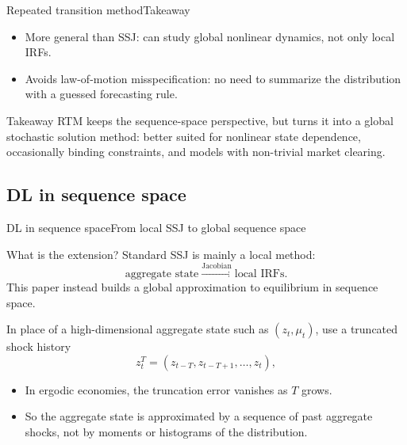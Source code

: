 \documentclass[aspectratio=169]{beamer}
\begin{document}
\begin{frame}{Repeated transition method}{Takeaway \cite{lee2025global}}
\small

\begin{itemize}
    \item \alert{More general than SSJ}: can study global nonlinear dynamics, not only local IRFs.
    \item \alert{Avoids law-of-motion misspecification}: no need to summarize the distribution with a guessed forecasting rule.
\end{itemize}

\begin{alertblock}{Takeaway}
RTM keeps the sequence-space perspective, but turns it into a \alert{global stochastic solution method}:
better suited for nonlinear state dependence, occasionally binding constraints, and models with non-trivial market clearing.
\end{alertblock}

\end{frame}

\subsection{DL in sequence space}

\begin{frame}{DL in sequence space}{From local SSJ to global sequence space}
\small

\begin{block}{What is the extension?}
Standard SSJ is mainly a \alert{local} method:
\[
\text{aggregate state} \xrightarrow{\text{Jacobian}} \text{local IRFs}.
\]
This paper instead builds a \alert{global approximation} to equilibrium in sequence space.
\end{block}

In place of a high-dimensional aggregate state such as $(z_t,\mu_t)$, use a truncated shock history
\[
z_t^T=(z_{t-T},z_{t-T+1},\ldots,z_t),
\]

\begin{itemize}
    \item In ergodic economies, the truncation error vanishes as $T$ grows.
    \item So the aggregate state is approximated by a \alert{sequence of past aggregate shocks},
    not by moments or histograms of the distribution.
\end{itemize}

\end{frame}
\end{document}
